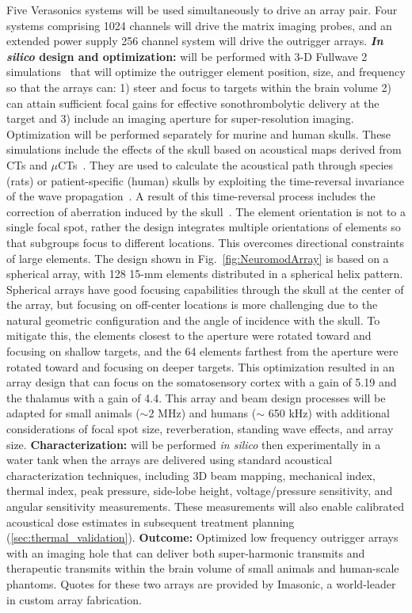 Five Verasonics systems will be used simultaneously to drive an array pair. Four systems comprising 1024 channels will drive the matrix imaging probes, and an extended power supply 256 channel system will drive the outrigger arrays.\textbf{ \textit{In silico} design and optimization:} will be performed with 3-D Fullwave 2 simulations~\cite{pinton2009heterogeneous,pinton2021fullwave} that will optimize the outrigger element position, size, and frequency so that the arrays can: 1)  steer and focus to targets within the brain volume 2) can attain sufficient focal gains for effective sonothrombolytic delivery at the target and 3) include an imaging aperture for super-resolution imaging. Optimization will be performed  separately for murine and human skulls. These simulations include the effects of the skull based on acoustical maps derived from  CTs and $\mu$CTs~\cite{Aubry2003,aubry2010high,pinton2009phase}. They are used to calculate the acoustical path through species (rats) or patient-specific (human) skulls by exploiting the time-reversal invariance of the wave propagation~\cite{fink1992time,pinton2009phase}. A result of this time-reversal process includes the correction of aberration induced by the skull~\cite{tanter1998focusing,pinton2009nonlinear_a}.  The element orientation is not to a single focal spot, rather the design integrates multiple orientations of elements so that subgroups focus to different locations. This overcomes directional constraints of large elements. The design shown in Fig.~\ref{fig:NeuromodArray} is based on a spherical array, with 128 15-mm elements distributed in a spherical helix pattern.  Spherical arrays have good focusing capabilities through the skull at the center of the array, but focusing on off-center locations is more challenging due to the natural geometric configuration and the angle of incidence with the skull. To mitigate this, the elements closest to the aperture were rotated toward and focusing on shallow targets, and the 64 elements farthest from the aperture were rotated toward and focusing on deeper targets. This optimization resulted in an array design that can focus on the somatosensory cortex with a gain of 5.19 and the thalamus with a gain of 4.4.  This array and beam design processes will be adapted for small animals ($\sim$2 MHz) and humans ($\sim$ 650 kHz) with additional considerations of focal spot size, reverberation, standing wave effects, and array size. \textbf{Characterization:} will be performed \textit{in silico} then experimentally  in a water tank  when the arrays are delivered using standard acoustical characterization techniques, including 3D beam mapping, mechanical index, thermal index, peak pressure, side-lobe height, voltage/pressure sensitivity, and angular sensitivity measurements. These measurements will also enable calibrated acoustical dose estimates in subsequent treatment planning (\ref{sec:thermal_validation}). \textbf{Outcome:} Optimized low frequency outrigger arrays with an imaging hole that can deliver both super-harmonic transmits and therapeutic transmits within the brain volume of small animals and human-scale phantoms. Quotes for these two arrays are provided by Imasonic, a world-leader in custom array fabrication. 




